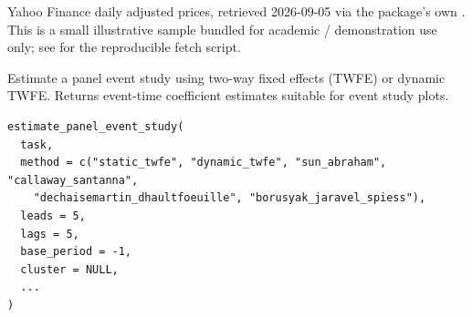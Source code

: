 \documentclass[a4paper]{book}
\begin{document}
%
\begin{Source}
Yahoo Finance daily adjusted prices, retrieved 2026-09-05 via the
package's own . This is a small
illustrative sample bundled for academic / demonstration use only; see
 for the reproducible fetch script.
\end{Source}
%
\begin{Examples}
\end{Examples}
%
\begin{Description}
Estimate a panel event study using two-way fixed effects (TWFE) or
dynamic TWFE. Returns event-time coefficient estimates suitable for
event study plots.
\end{Description}
%
\begin{Usage}
\begin{verbatim}
estimate_panel_event_study(
  task,
  method = c("static_twfe", "dynamic_twfe", "sun_abraham", "callaway_santanna",
    "dechaisemartin_dhaultfoeuille", "borusyak_jaravel_spiess"),
  leads = 5,
  lags = 5,
  base_period = -1,
  cluster = NULL,
  ...
)
\end{verbatim}
\end{Usage}
%
\end{document}

